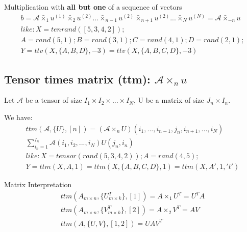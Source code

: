 \documentclass{Note}
\begin{document}
Multiplication with \textbf{all but one} of a sequence of vectors
\begin{equation}
\begin{aligned}
b=\mathcal{A}\bar{\times}_1 u^{(1)}\bar{\times}_2 u^{(2)}...\bar{\times}_{n-1} u^{(2)}\bar{\times}_{n+1} u^{(2)}...\bar{\times}_N u^{(N)}=\mathcal{A}\bar{\times}_{-n} {u}\\
like:
X = tenrand([5,3,4,2]); \\
A = rand(5,1); B = rand(3,1); C = rand(4,1); D = rand(2,1); \\
Y = ttv(X, \{A,B,D\}, -3) = ttv(X, \{A,B,C,D\}, -3)
\end{aligned}
\end{equation}

\subsection{Tensor times matrix (ttm): $\mathcal{A}{\times}_n u$}
Let $\mathcal{A}$ be a tensor of size $I_1\times I_2\times ...\times I_N$, U be a matrix of size $J_n\times I_n$.

We have:
\begin{equation}
\begin{aligned}
ttm(\mathcal{A},\{U\},[n])=(\mathcal{A}{\times}_n U)(i_1,...,i_{n-1},j_{n},i_{n+1},...,i_N)\\
\sum_{i_n=1}^{I_n}\mathcal{A}(i_1,i_2,...,i_N)U(j_n, i_n)\\
like:X = tensor(rand(5,3,4,2));
A = rand(4,5);\\
Y = ttm(X, A, 1)= ttm(X, \{A,B,C,D\}, 1)= ttm(X, A', 1, 't')    
\end{aligned}
\end{equation}

Matrix Interpretation
\begin{equation}
\begin{aligned}
ttm(A_{m\times n},\{U_{m\times k}^T\},[1])=A\times _1 U^T=U^TA\\
ttm(A_{m\times n},\{V_{m\times k}^T\},[2])=A\times _2 V^T=AV\\
ttm(A,\{U,V\},[1,2])=UAV^T
\end{aligned}
\end{equation}
\end{document}
